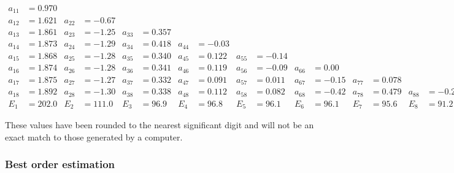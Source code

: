 {
\begin{align*}
a_{11} &= 0.970 &&&&&&&&&&&&&& \\
a_{12} &= 1.621 & a_{22} &= -0.67 &&&&&&&&&&&& \\
a_{13} &= 1.861 & a_{23} &= -1.25 & a_{33} &= 0.357 &&&&&&&&&& \\
a_{14} &= 1.873 & a_{24} &= -1.29 & a_{34} &= 0.418 & a_{44} &= -0.03 &&&&&&&& \\
a_{15} &= 1.868 & a_{25} &= -1.28 & a_{35} &= 0.340 & a_{45} &= 0.122 & a_{55} &= -0.14 &&&&&& \\
a_{16} &= 1.874 & a_{26} &= -1.28 & a_{36} &= 0.341 & a_{46} &= 0.119 & a_{56} &= -0.09 & a_{66} &= 0.00 &&&& \\
a_{17} &= 1.875 & a_{27} &= -1.27 & a_{37} &= 0.332 & a_{47} &= 0.091 & a_{57} &= 0.011 & a_{67} &= -0.15 & a_{77} &= 0.078 & & \\
a_{18} &= 1.892 & a_{28} &= -1.30 & a_{38} &= 0.338 & a_{48} &= 0.112 & a_{58} &= 0.082 & a_{68} &= -0.42 & a_{78} &= 0.479 & a_{88} &= -0.214 \\
E_1 &= 202.0 & E_2 &= 111.0 & E_3 &= 96.9 & E_4 &= 96.8 & E_5 &= 96.1 & E_6 &= 96.1 & E_7 &= 95.6 & E_8 &= 91.2
\end{align*}
}
\par
\noindent
These values have been rounded to the nearest significant digit
and will not be an exact match to those generated by a computer.

\clearpage

\subsubsection{Best order estimation}

